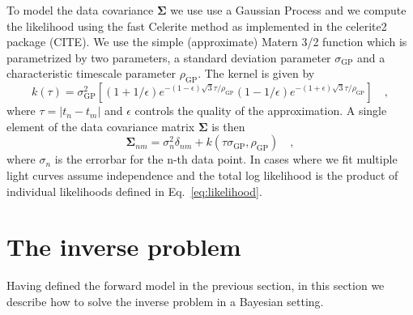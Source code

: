 \documentclass[modern]{aastex62}
\begin{document}
To model the data covariance $\boldsymbol{\Sigma}$ we use use a Gaussian Process and we compute the likelihood using the fast Celerite method \citep{foreman-mackey2017} as implemented in the \textsf{celerite2} package (CITE).
We use the simple (approximate) Matern 3/2 function which is parametrized by two parameters, a standard deviation parameter $\sigma_\mathrm{GP}$ and a characteristic timescale parameter $\rho_\mathrm{GP}$.
The kernel is given by 
\begin{equation}
    k(\tau)=\sigma_\mathrm{GP}^{2}\left[(1+1 / \epsilon) e^{-(1-\epsilon) \sqrt{3} \tau / \rho_\mathrm{GP}}(1-1 / \epsilon) e^{-(1+\epsilon) \sqrt{3} \tau / \rho_\mathrm{GP}}\right]
    \quad,
\end{equation}
where $\tau=|t_n-t_m|$ and $\epsilon$ controls the quality of the approximation.
A single element of the data covariance matrix $\boldsymbol{\Sigma}$ is then 
\begin{equation}
    \boldsymbol{\Sigma}_{nm}=\sigma_n^2\delta_{nm} + k(\tau\sigma_\mathrm{GP},\rho_\mathrm{GP})
    \quad,
    \label{eq:data_covariance_element}
\end{equation}
where $\sigma_n$ is the errorbar for the n-th data point.
In cases where we fit multiple light curves assume independence and the total log likelihood is the product of individual likelihoods defined in Eq.~\ref{eq:likelihood}.

\section{The inverse problem}
\label{sec:inverse_problem}
Having defined the forward model in the previous section, in this section we describe how to solve the inverse problem in a Bayesian setting.
\end{document}
